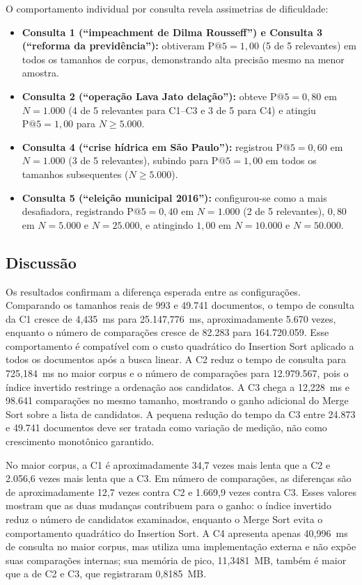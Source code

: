 \documentclass[12pt, a4paper]{article}
\begin{document}
O comportamento individual por consulta revela assimetrias de dificuldade:
\begin{itemize}
    \item \textbf{Consulta 1 (``impeachment de Dilma Rousseff'') e Consulta 3 (``reforma da previdência''):} obtiveram $\text{P@5} = 1{,}00$ (5 de 5 relevantes) em todos os tamanhos de corpus, demonstrando alta precisão mesmo na menor amostra.
    \item \textbf{Consulta 2 (``operação Lava Jato delação''):} obteve $\text{P@5} = 0{,}80$ em $N=1.000$ (4 de 5 relevantes para C1--C3 e 3 de 5 para C4) e atingiu $\text{P@5} = 1{,}00$ para $N \ge 5.000$.
    \item \textbf{Consulta 4 (``crise hídrica em São Paulo''):} registrou $\text{P@5} = 0{,}60$ em $N=1.000$ (3 de 5 relevantes), subindo para $\text{P@5} = 1{,}00$ em todos os tamanhos subsequentes ($N \ge 5.000$).
    \item \textbf{Consulta 5 (``eleição municipal 2016''):} configurou-se como a mais desafiadora, registrando $\text{P@5} = 0{,}40$ em $N=1.000$ (2 de 5 relevantes), $0{,}80$ em $N=5.000$ e $N=25.000$, e atingindo $1{,}00$ em $N=10.000$ e $N=50.000$.
\end{itemize}



\subsection{Discussão}

Os resultados confirmam a diferença esperada entre as configurações. Comparando os tamanhos reais de 993 e 49.741 documentos, o tempo de consulta da C1 cresce de 4,435~ms para 25.147,776~ms, aproximadamente 5.670 vezes, enquanto o número de comparações cresce de 82.283 para 164.720.059. Esse comportamento é compatível com o custo quadrático do Insertion Sort aplicado a todos os documentos após a busca linear. A C2 reduz o tempo de consulta para 725,184~ms no maior corpus e o número de comparações para 12.979.567, pois o índice invertido restringe a ordenação aos candidatos. A C3 chega a 12,228~ms e 98.641 comparações no mesmo tamanho, mostrando o ganho adicional do Merge Sort sobre a lista de candidatos. A pequena redução do tempo da C3 entre 24.873 e 49.741 documentos deve ser tratada como variação de medição, não como crescimento monotônico garantido.

No maior corpus, a C1 é aproximadamente 34,7 vezes mais lenta que a C2 e 2.056,6 vezes mais lenta que a C3. Em número de comparações, as diferenças são de aproximadamente 12,7 vezes contra C2 e 1.669,9 vezes contra C3. Esses valores mostram que as duas mudanças contribuem para o ganho: o índice invertido reduz o número de candidatos examinados, enquanto o Merge Sort evita o comportamento quadrático do Insertion Sort. A C4 apresenta apenas 40,996~ms de consulta no maior corpus, mas utiliza uma implementação externa e não expõe suas comparações internas; sua memória de pico, 11,3481~MB, também é maior que a de C2 e C3, que registraram 0,8185~MB.
\end{document}
